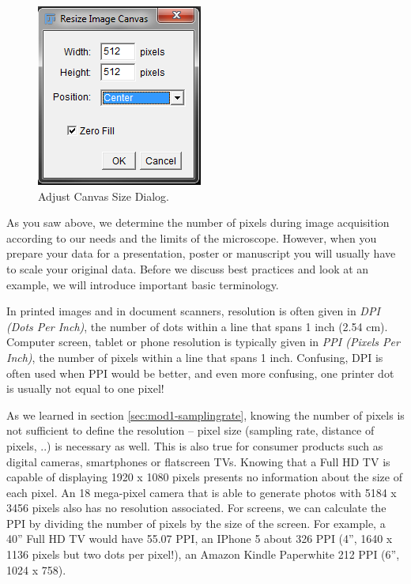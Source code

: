 \begin{figure}[!ht]
	\captionsetup{justification=centering}
	\centering
		\includegraphics{mod1-publishing/figures/adjust-canvas-dialog.png}
		\caption{Adjust Canvas Size Dialog.}\label{fig:adjust-canvas-dialog}
\end{figure}

As you saw above, we determine the number of pixels during image acquisition according to our needs and the limits of the microscope. However, when you prepare your data for a presentation, poster or manuscript you will usually have to scale your original data. Before we discuss best practices and look at an example, we will introduce important basic terminology.


In printed images and in document scanners, resolution is often given in \emph{DPI (Dots Per Inch)}, the number of dots within a line that spans 1 inch (2.54 cm). Computer screen, tablet or phone resolution is typically given in \emph{PPI (Pixels Per Inch)}, the number of pixels within a line that spans 1 inch. Confusing, DPI is often used when PPI would be better, and even more confusing, one printer dot is usually not equal to one pixel! 

As we learned in section \ref{sec:mod1-samplingrate}, knowing the number of pixels is not sufficient to define the resolution -- pixel size (sampling rate, distance of pixels, ..) is necessary as well. This is also true for consumer products such as digital cameras, smartphones or flatscreen TVs. Knowing that a Full HD TV is capable of displaying 1920 x 1080 pixels presents no information about the size of each pixel. An 18 mega-pixel camera that is able to generate photos with 5184 x 3456 pixels also has no resolution associated. For screens, we can calculate the PPI by dividing the number of pixels by the size of the screen. For example, a 40'' Full HD TV would have 55.07 PPI, an IPhone 5 about 326 PPI (4'', 1640 x 1136 pixels but two dots per pixel!), an Amazon Kindle Paperwhite 212 PPI (6'', 1024 x 758). 

